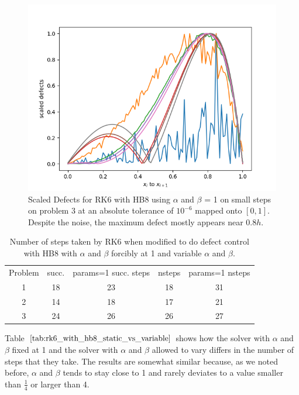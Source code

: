 \begin{figure}[H]
\centering
\includegraphics[width=0.7\linewidth]{./figures/static_alpha_rk6_with_hb8_p3_scaled_defects_small_steps}
\caption{Scaled Defects for RK6 with HB8 using $\alpha$ and $\beta$ = 1 on small steps on problem 3 at an absolute tolerance of $10^{-6}$ mapped onto $[0, 1]$. Despite the noise, the maximum defect mostly appears near $0.8h$.}
\label{fig:static_alpha_rk6_with_hb8_p3_scaled_defects_small_steps}
\end{figure}

\begin{table}[h]
\caption {Number of steps taken by RK6 when modified to do defect control with HB8 with $\alpha$ and $\beta$ forcibly at 1 and variable $\alpha$ and $\beta$.} \label{tab:rk6_with_hb8_static_vs_variable}
\begin{center}
\begin{tabular}{ c c c c c } 
Problem & succ. & params=1 succ. steps & nsteps & params=1 nsteps \\ 
1       & 18                      &        23               & 18         & 31\\ 
2       & 14                      &        18               & 17         & 21\\
3       & 24                      &        26               & 26         & 27\\
\end{tabular}
\end{center}
\end{table}	

Table $\ref{tab:rk6_with_hb8_static_vs_variable}$ shows how the solver with $\alpha$ and $\beta$ fixed at 1 and the solver with $\alpha$ and $\beta$ allowed to vary differs in the number of steps that they take. The results are somewhat similar because, as we noted before, $\alpha$ and $\beta$ tends to stay close to 1 and rarely deviates to a value smaller than $\frac{1}{4}$ or larger than 4.

